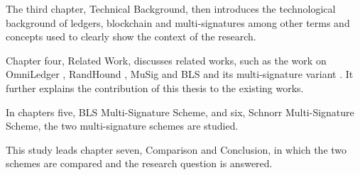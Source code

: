 The third chapter, Technical Background, then introduces the technological background of ledgers, blockchain and multi-signatures among other terms and concepts used to clearly show the context of the research.

Chapter four, Related Work, discusses related works, such as the work on OmniLedger \cite{OmniLedger}, RandHound \cite{RandHound}, MuSig \cite{SchnorrMulti} and BLS \cite{BLSMulti} and its multi-signature variant \cite{BLSMulti}. It further explains the contribution of this thesis to the existing works.

In chapters five, BLS Multi-Signature Scheme, and six, Schnorr Multi-Signature Scheme, the two multi-signature schemes are studied.

This study leads chapter seven, Comparison and Conclusion, in which the two schemes are compared and the research question is answered.